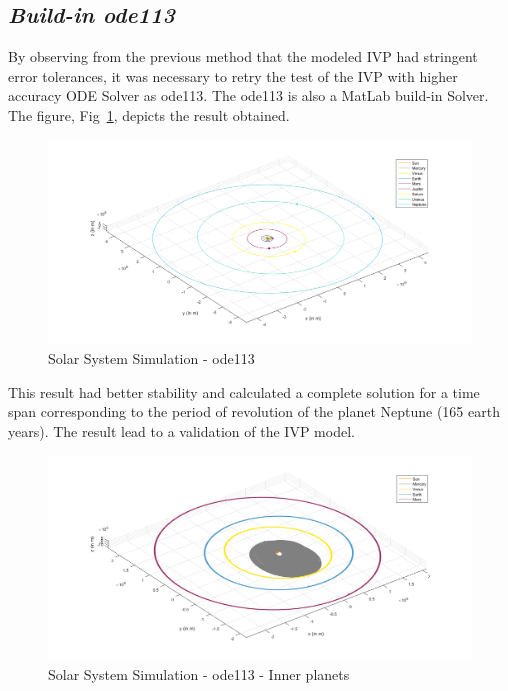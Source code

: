 \documentclass[a4paper]{article}
\begin{document}
\pagebreak

\subsection{\textit{Build-in ode113}}
By observing from the previous method that the modeled IVP had stringent error tolerances, it was necessary to retry the test of the IVP with higher accuracy ODE Solver as ode113. The ode113 is also a MatLab build-in Solver. The figure, Fig~\ref{fig:Solar_System_-_ode113}, depicts the result obtained.

\begin{figure}[H]
\centering
\includegraphics[width=1\textwidth]{Solar_System_-_ode113.png}
\caption{Solar System Simulation - ode113}
\label{fig:Solar_System_-_ode113}
\end{figure}

This result had better stability and calculated a complete solution for a time span corresponding to the period of revolution of the planet Neptune (165 earth years). The result lead to a validation of the IVP model.

\begin{figure}[H]
\centering
\includegraphics[width=1\textwidth]{Solar_System_-_ode113_-_ipsim.png}
\caption{Solar System Simulation - ode113 - Inner planets }
\label{fig:Solar_System_-_ode113_-_ipsim}
\end{figure}
\end{document}
